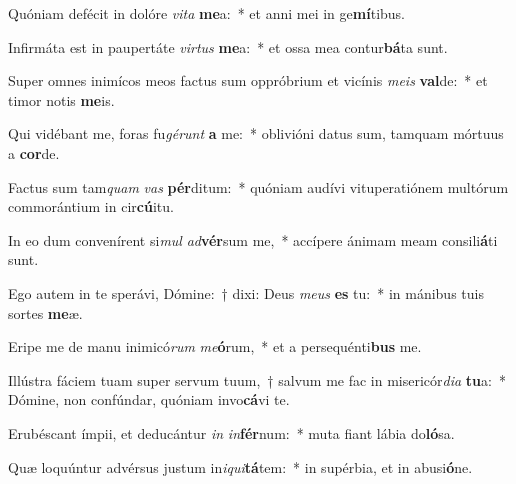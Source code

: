 \item Quóniam defécit in dolóre \textit{vi}\textit{ta} \textbf{me}a:~* et anni mei in ge\textbf{mí}tibus.
\item Infirmáta est in paupertáte \textit{vir}\textit{tus} \textbf{me}a:~* et ossa mea contur\textbf{bá}ta sunt.
\item Super omnes inimícos meos factus sum oppróbrium et vicínis \textit{me}\textit{is} \textbf{val}de:~* et timor notis \textbf{me}is.
\item Qui vidébant me, foras fu\textit{gé}\textit{runt} \textbf{a} me:~* oblivióni datus sum, tamquam mórtuus a \textbf{cor}de.
\item Factus sum tam\textit{quam} \textit{vas} \textbf{pér}ditum:~* quóniam audívi vituperatiónem multórum commorántium in cir\textbf{cú}itu.
\item In eo dum convenírent si\textit{mul} \textit{ad}\textbf{vér}sum me,~* accípere ánimam meam consili\textbf{á}ti sunt.
\item Ego autem in te sperávi, Dómine:~† dixi: Deus \textit{me}\textit{us} \textbf{es} tu:~* in mánibus tuis sortes \textbf{me}æ.
\item Eripe me de manu inimicó\textit{rum} \textit{me}\textbf{ó}rum,~* et a persequénti\textbf{bus} me.
\item Illústra fáciem tuam super servum tuum,~† salvum me fac in misericór\textit{di}\textit{a} \textbf{tu}a:~* Dómine, non confúndar, quóniam invo\textbf{cá}vi te.
\item Erubéscant ímpii, et deducántur \textit{in} \textit{in}\textbf{fér}num:~* muta fiant lábia do\textbf{ló}sa.
\item Quæ loquúntur advérsus justum in\textit{i}\textit{qui}\textbf{tá}tem:~* in supérbia, et in abusi\textbf{ó}ne.
